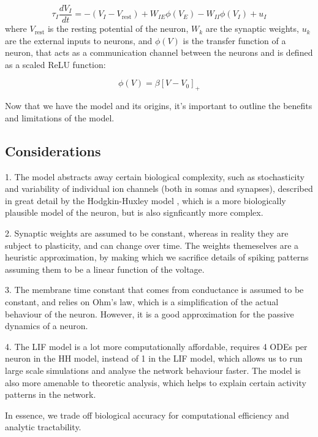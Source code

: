 \documentclass[10pt,twocolumn]{article}
\begin{document}
\begin{equation}
    \tau_I \frac{dV_I}{dt} = 
    -(V_I - V_{\text{rest}}) 
    + W_{IE} \phi(V_E) 
    - W_{II} \phi(V_I) + u_I
\end{equation}
where $V_{\text{rest}}$ is the resting potential of the neuron, $W_{k}$ are the 
synaptic weights, $u_k$ are the external inputs to neurons, 
and $\phi(V)$ is the transfer function of a neuron, that acts as 
a communication channel between the neurons and is defined as a scaled ReLU function:

\begin{equation}
    \phi(V) = \beta[V-V_0]_+
\end{equation}

Now that we have the model and its origins, it's important to outline 
the benefits and limitations of the model.

\subsection{Considerations}
1. The model abstracts away certain biological complexity, such as stochasticity and
variability of individual ion channels (both in somas and synapses), described in
great detail by the Hodgkin-Huxley model \cite{hodgkin1952quantitative}, which is
a more biologically plausible model of the neuron, 
but is also signficantly more complex.

2. Synaptic weights are assumed to be constant, whereas in reality they are subject to
plasticity, and can change over time.
The weights themeselves are a heuristic approximation, 
by making which we sacrifice details of 
spiking patterns assuming them to be a linear function of the voltage.

3. The membrane time constant that comes from conductance is assumed to be constant,
and relies on Ohm's law, which is a simplification of the actual behaviour of the neuron.
However, it is a good approximation for the passive dynamics of a neuron.  

4. The LIF model is a lot more computationally affordable, requires 4 ODEs
per neuron in the HH model, instead of 1 in the LIF model, 
which allows us to run large scale simulations and analyse 
the network behaviour faster. The model is also more amenable 
to theoretic analysis, which helps to explain certain activity patterns in the network.

In essence, we trade off biological accuracy for 
computational efficiency and analytic tractability.
\end{document}
